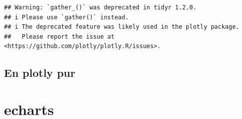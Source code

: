 \documentclass[
]{book}
\newenvironment{Shaded}{\begin{snugshade}}{\end{snugshade}}
\newcommand{\AttributeTok}[1]{\textcolor[rgb]{0.77,0.63,0.00}{#1}}
\newcommand{\FunctionTok}[1]{\textcolor[rgb]{0.00,0.00,0.00}{#1}}
\newcommand{\NormalTok}[1]{#1}
\newcommand{\SpecialCharTok}[1]{\textcolor[rgb]{0.00,0.00,0.00}{#1}}
\newcommand{\StringTok}[1]{\textcolor[rgb]{0.31,0.60,0.02}{#1}}
\begin{document}
\begin{verbatim}
## Warning: `gather_()` was deprecated in tidyr 1.2.0.
## i Please use `gather()` instead.
## i The deprecated feature was likely used in the plotly package.
##   Please report the issue at <https://github.com/plotly/plotly.R/issues>.
\end{verbatim}

\hypertarget{en-plotly-pur}{%
\subsection{En plotly pur}\label{en-plotly-pur}}

\begin{Shaded}
\end{Shaded}

\hypertarget{echarts}{%
\section{echarts}\label{echarts}}
\end{document}

